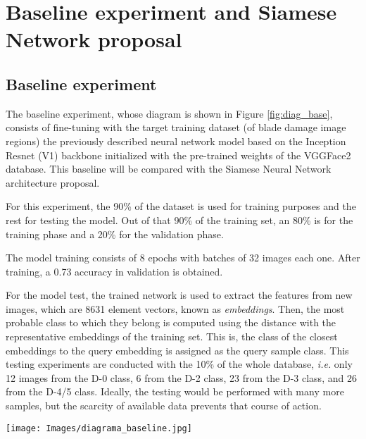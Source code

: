 \section{Baseline experiment and Siamese Network proposal}
\label{sec:experiments}

\subsection{Baseline experiment}
\label{subsec:baselineExp}

The baseline experiment, whose diagram is shown in Figure  \ref{fig:diag_base}, consists of fine-tuning with the target training dataset (of blade damage image regions) the previously described neural network model based on the Inception Resnet (V1) backbone initialized with the pre-trained weights of the VGGFace2 database. This baseline will be compared with the Siamese Neural Network architecture proposal.

For this experiment, the 90\% of the dataset is used for training purposes and the rest for testing the model. Out of that 90\% of the training set, an 80\% is for the training phase and a 20\% for the validation phase.

The model training consists of 8 epochs with batches of 32 images each one. After training, a 0.73 accuracy in validation is obtained. 

For the model test, the trained network is used to extract the features from new images, which are 8631 element vectors, known as \emph{embeddings}. Then, the most probable class to which they belong is computed using the distance with the representative embeddings of the training set. This is, the class of the closest embeddings to the query embedding is assigned as the query sample class. This testing experiments are conducted with the 10\% of the whole database, \emph{i.e.} only 12 images from the D-0 class, 6 from the D-2 class, 23 from the D-3 class, and 26 from the D-4/5 class. Ideally, the testing would be performed with many more samples, but the scarcity of available data prevents that course of action.

\begin{figure*}[htbp]
        \centering
            \texttt{[image: Images/diagrama\_baseline.jpg]}
             \caption[Baseline model diagram.]
            {\small Baseline model diagram.}   
            \label{fig:diag_base}
    \end{figure*}

